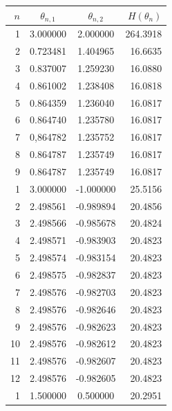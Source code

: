 \documentclass{abnt}
\begin{document}
\begin{table}
        \begin{center}
                \begin{tabular}{ r | c c r  }
                        \hline
                        $n$ & $\theta_{n,1}$ & $\theta_{n,2}$ & $H(\theta_n)$ \\
                        \hline
                        1 & 3.000000 & 2.000000 & 264.3918 \\
                        2 & 0.723481& 1.404965 & 16.6635 \\
                        3 & 0.837007 & 1.259230 & 16.0880 \\
                        4 & 0.861002 & 1.238408 & 16.0818 \\
                        5 & 0.864359 & 1.236040 & 16.0817 \\
                        6 & 0.864740 & 1.235780 & 16.0817 \\
                        7 & 0,864782 & 1.235752 & 16.0817 \\
                        8 & 0.864787 & 1.235749 & 16.0817 \\
                        9 & 0.864787 & 1.235749 & 16.0817 \\
                        \hline
                        1 & 3.000000 & -1.000000 & 25.5156 \\
                        2 & 2.498561 & -0.989894 & 20.4856 \\
                        3 & 2.498566 & -0.985678 & 20.4824 \\
                        4 & 2.498571 & -0.983903 & 20.4823 \\
                        5 & 2.498574 & -0.983154 & 20.4823 \\
                        6 & 2.498575 & -0.982837 & 20.4823 \\
                        7 & 2.498576 & -0.982703 & 20.4823 \\
                        8 & 2.498576 & -0.982646 & 20.4823 \\
                        9 & 2.498576 & -0.982623 & 20.4823 \\
                        10 & 2.498576 & -0.982612 & 20.4823 \\
                        11 & 2.498576 & -0.982607 & 20.4823 \\
                        12 & 2.498576 & -0.982605 & 20.4823 \\
                        \hline
                        1 & 1.500000 & 0.500000 & 20.2951 \\

\end{tabular}
\end{center}
\end{table}
\end{document}
